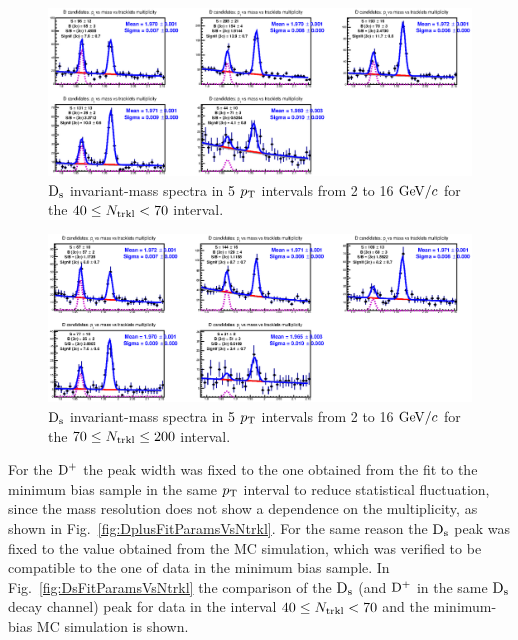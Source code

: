 \begin{figure}[htpb]
\centering
 \includegraphics[width=.9\textwidth]{FigCap6/DsMass4070.eps}
 \caption{${\rm D_s}$ invariant-mass spectra in 5 $p_{\rm T}$ intervals from 2 to 16 $\mathrm{GeV}/c$ for the $40 \leq N_{\rm trkl} < 70$ interval.}
 \label{fig:DsInvMassVsNtrkl_2}
\end{figure}

\begin{figure}[htpb]
\centering
 \includegraphics[width=.9\textwidth]{FigCap6/DsMass70200.eps}
 \caption{${\rm D_s}$ invariant-mass spectra in 5 $p_{\rm T}$ intervals from 2 to 16 $\mathrm{GeV}/c$ for the $70 \leq N_{\rm trkl} \leq 200$ interval.}
 \label{fig:DsInvMassVsNtrkl_3}
\end{figure}

For the ${\rm D^+}$ the peak width was fixed to the one obtained from the fit to the minimum bias sample in the same $p_{\rm T}$ interval to reduce statistical fluctuation, since the mass resolution does not show a dependence on the multiplicity, as shown in Fig.~\ref{fig:DplusFitParamsVsNtrkl}. For the same reason the ${\rm D_s}$ peak was fixed to the value obtained from the MC simulation, which was verified to be compatible to the one of data in the minimum bias sample. In Fig.~\ref{fig:DsFitParamsVsNtrkl} the comparison of the ${\rm D_s}$ (and ${\rm D^+}$ in the same ${\rm D_s}$ decay channel) peak for  data in the interval $40 \leq N_{\rm trkl} < 70$ and the minimum-bias MC simulation is shown. 


